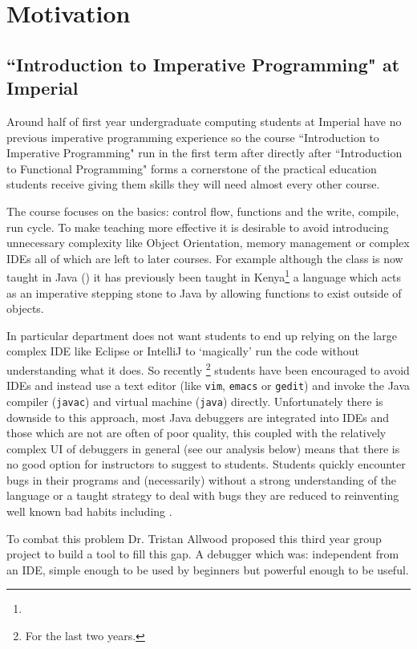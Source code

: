 \documentclass[11pt, a4paper]{article}
\newcommand{\cmd}[1]{{\tt #1}}
\begin{document}
\clearpage
\tableofcontents
\clearpage

\section{Motivation}
\subsection{``Introduction to Imperative Programming" at Imperial}
Around half of first year undergraduate computing students at Imperial have no previous imperative programming experience\cite{projectproposal} so the course ``Introduction to Imperative Programming" run in the first term after directly after ``Introduction to Functional Programming" forms a cornerstone of the practical education students receive giving them skills they will need almost every other course.

The course focuses on the basics: control flow, functions and the write, compile, run cycle.
To make teaching more effective it is desirable to avoid introducing unnecessary complexity like Object Orientation, memory management or complex IDEs all of which are left to later courses.
For example although the class is now taught in Java () it has previously been taught in Kenya\footnote{} a language which acts as an imperative stepping stone to Java by allowing functions to exist outside of objects.

In particular department does not want students to end up relying on the large complex IDE like Eclipse or IntelliJ to `magically' run the code without understanding what it does.
So recently  \footnote{For the last two years.} students have been encouraged to avoid IDEs and instead use a text editor (like \cmd{vim}, \cmd{emacs} or \cmd{gedit}) and invoke the Java compiler (\cmd{javac}) and virtual machine (\cmd{java}) directly.
Unfortunately there is downside to this approach, most Java debuggers are integrated into IDEs and those which are not are often of poor quality, this coupled with the relatively complex UI of debuggers in general (see our analysis below) means that there is no good option for instructors to suggest to students.
Students quickly encounter bugs in their programs and (necessarily) without a strong understanding of the language or a taught strategy to deal with bugs they are reduced to reinventing well known bad habits including .

To combat this problem Dr. Tristan Allwood proposed\cite{projectproposal} this third year group project to build a tool to fill this gap.
A debugger which was: independent from an IDE, simple enough to be 	used by beginners but powerful enough to be useful.
\end{document}
